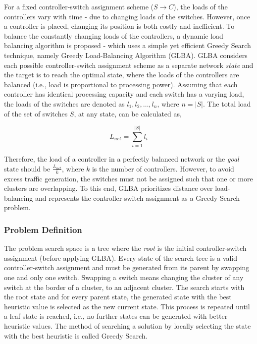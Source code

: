 \documentclass[a4paper,fleqn]{cas-dc}
\begin{document}
\noindent For a fixed controller-switch assignment scheme ($S\rightarrow C$), the loads of the controllers vary with time - due to changing loads of the switches. However, once a controller is placed, changing its position is both costly and inefficient. To balance the constantly changing loads of the controllers, a dynamic load balancing algorithm is proposed - which uses a simple yet efficient Greedy Search technique, namely Greedy Load-Balancing Algorithm (GLBA). GLBA considers each possible controller-switch assignment scheme as a separate network \textit{state} and the target is to reach the optimal state, where the loads of the controllers are balanced (i.e., load is proportional to processing power). Assuming that each controller has identical processing capacity and each switch has a varying load, the loads of the switches are denoted as $l_1, l_2, \dots,l_n$, where $n=|S|$. The total load of the set of switches $S$, at any state, can be calculated as,

\begin{equation}
L_{net}=\sum_{i=1}^{|S|}l_i
\end{equation}

Therefore, the load of a controller in a perfectly balanced network or the \textit{goal} state should be $\frac{L_{net}}{k}$, where $k$ is the number of controllers. However, to avoid excess traffic generation, the switches must not be assigned such that one or more clusters are overlapping. To this end, GLBA prioritizes distance over load-balancing and represents the controller-switch assignment as a Greedy Search problem.

\subsubsection{Problem Definition} \label{probDef}
\noindent The problem search space is a tree where the \textit{root} is the initial controller-switch assignment (before applying GLBA). Every state of the search tree is a valid controller-switch assignment and must be generated from its parent by swapping one and only one switch. Swapping a switch means changing the cluster of any switch at the border of a cluster, to an adjacent cluster. The search starts with the root state and for every parent state, the generated state with the best heuristic value is selected as the new current state. This process is repeated until a leaf state is reached, i.e., no further states can be generated with better heuristic values. The method of searching a solution by locally selecting the state with the best heuristic is called Greedy Search.
\end{document}
